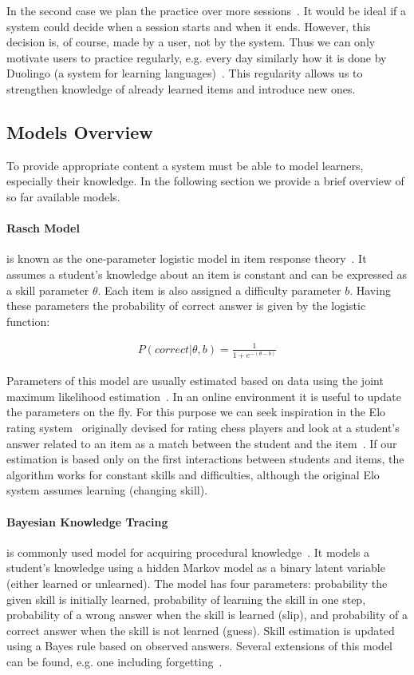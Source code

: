 \documentclass[table,color,cover,twoside,nolot,nolof]{fithesis3/fithesis3}
\begin{document}
In the second case we plan the practice over more
sessions~\cite{kang2014retrieval}. It would be ideal if a system could decide when a
session starts and when it ends. However, this decision is, of course, made by a user,
not by the system. Thus we can only motivate users to practice regularly, e.g.
every day similarly how it is done by Duolingo (a system for learning
languages)~\cite{garcia2013learning}. This regularity allows us to strengthen
knowledge of already learned items and introduce new ones.

\subsection{Models Overview}

To provide appropriate content a system must be able to model learners,
especially their knowledge. In the following section we provide a brief
overview of so far available models.

\paragraph*{Rasch Model} is known as the one-parameter logistic model in item
response theory~\cite{de2008theory}. It assumes a student's knowledge about
an item is constant and can be expressed as a skill parameter $\theta$. Each
item is also assigned a difficulty parameter $b$. Having these parameters
the probability of correct answer is given by the logistic function:

\begin{align}
P(correct|\theta,b) = \frac{1}{1 + e^{-(\theta - b)}}
\end{align}

Parameters of this model are usually estimated based on data using the joint
maximum likelihood estimation~\cite{de2008theory}. In an online environment it is
useful to update the parameters on the fly. For this purpose we can seek
inspiration in the Elo rating system~\cite{elo1978rating} originally devised for
rating chess players and look at a student's answer related to an item as a
match between the student and the item~\cite{papousek2014adaptive}. If our
estimation is based only on the first interactions between students and items,
the algorithm works for constant skills and difficulties, although the original
Elo system assumes learning (changing skill).

\paragraph*{Bayesian Knowledge Tracing} is commonly used model for
acquiring procedural knowledge~\cite{van2013properties}. It models a student's
knowledge using a hidden Markov model as a binary latent variable (either learned
or unlearned). The model has four parameters: probability the given skill is
initially learned, probability of learning the skill in one step, probability of
a wrong answer when the skill is learned (slip), and probability of a correct
answer when the skill is not learned (guess). Skill estimation is updated using
a Bayes rule based on observed answers. Several extensions of this model can be
found, e.g. one including forgetting~\cite{qiu2010does}.
\end{document}
